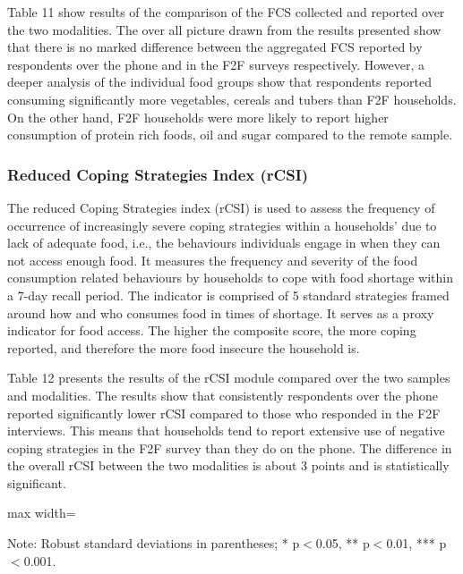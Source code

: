 \documentclass[11pt,harvard]{article}
\begin{document}
	Table 11 show results of the comparison of the FCS collected and reported over the two modalities. The over all picture drawn from the results presented show that there is no marked difference between the aggregated FCS reported by respondents over the phone and in the F2F surveys respectively. However, a deeper analysis of the individual food groups show that respondents reported consuming significantly more vegetables, cereals and tubers than F2F households. On the other hand, F2F households were more likely to report higher consumption of protein rich foods, oil and sugar compared to the remote sample.
	
	
	
	
	\subsubsection{Reduced Coping Strategies Index (rCSI)}
	
	The reduced Coping Strategies index (rCSI) is used to assess the frequency of occurrence of increasingly severe coping strategies within a households’ due to lack of adequate food, i.e., the behaviours individuals engage in when they can not access enough food. It measures the frequency and severity of the food consumption related behaviours by households to cope with food shortage within a 7-day recall period. The indicator is comprised of 5 standard strategies framed around how and who consumes food in times of shortage. It serves as a proxy indicator for food access. The higher the composite score, the more coping reported, and therefore the more food insecure the household is.
	
	Table 12 presents the results of the rCSI module compared over the two samples and modalities. The results show that consistently respondents over the phone reported significantly lower rCSI compared to those who responded in the F2F interviews.	This means that households tend to report extensive use of negative coping strategies in the F2F survey than they do on the phone. The difference in the overall rCSI between the two modalities is about 3 points and is statistically significant. 
	
	\begin{table}[htbp]
		\centering
		\begin{adjustbox}{max width=\textwidth}
			\begin{threeparttable}
				\caption{Impact of Survey Modality on Reduced Coping Strategy Index Classification}
				\scriptsize%
				 
				\label{tab:rCSI_Modality_BF}
				\begin{tablenotes}
					\item Note: Robust standard deviations in parentheses; * p$<$0.05, ** p$<$0.01, *** p$<$0.001.
				\end{tablenotes}
			\end{threeparttable}
		\end{adjustbox}
	\end{table}
	
\end{document}
